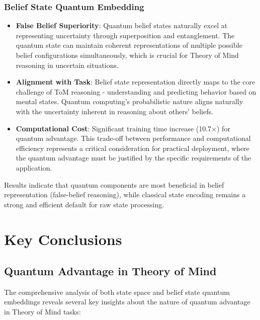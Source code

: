 \documentclass[11pt]{article}
\begin{document}
\subsubsection{Belief State Quantum Embedding}
\begin{itemize}
    \item \textbf{False Belief Superiority}: Quantum belief states naturally excel at representing uncertainty through superposition and entanglement. The quantum state can maintain coherent representations of multiple possible belief configurations simultaneously, which is crucial for Theory of Mind reasoning in uncertain situations.
    \item \textbf{Alignment with Task}: Belief state representation directly maps to the core challenge of ToM reasoning - understanding and predicting behavior based on mental states. Quantum computing's probabilistic nature aligns naturally with the uncertainty inherent in reasoning about others' beliefs.
    \item \textbf{Computational Cost}: Significant training time increase (10.7×) for quantum advantage. This trade-off between performance and computational efficiency represents a critical consideration for practical deployment, where the quantum advantage must be justified by the specific requirements of the application.
\end{itemize}

Results indicate that quantum components are most beneficial in belief representation (false-belief reasoning), while classical state encoding remains a strong and efficient default for raw state processing.

\section{Key Conclusions}

\subsection{Quantum Advantage in Theory of Mind}

The comprehensive analysis of both state space and belief state quantum embeddings reveals several key insights about the nature of quantum advantage in Theory of Mind tasks:
\end{document}
